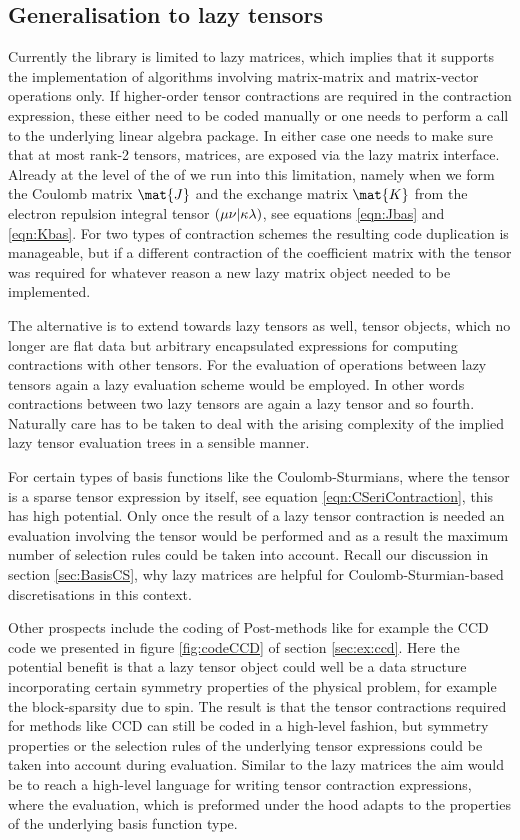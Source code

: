 \subsection{Generalisation to lazy tensors}
Currently the \lazyten library is limited to lazy matrices,
which implies that it supports the implementation of algorithms
involving matrix-matrix and matrix-vector operations only.
If higher-order tensor contractions are required in the contraction expression,
these either need to be coded manually or one needs to perform
a call to the underlying linear algebra package.
In either case one needs to make sure that at most rank-2 tensors,
\ie matrices, are exposed via the lazy matrix interface.
Already at the level of the \SCF of \molsturm we run into this limitation,
namely when we form the Coulomb matrix $\mat{J}$
and the exchange matrix $\mat{K}$ from the electron repulsion integral tensor
$\left( \mu\nu \middle| \kappa\lambda \right)$, see equations \eqref{eqn:Jbas} and \eqref{eqn:Kbas}.
For two types of contraction schemes the resulting code duplication is manageable,
but if a different contraction of the coefficient matrix
with the \ERI tensor was required for whatever reason
a new lazy matrix object needed to be implemented.

The alternative is to extend \lazyten towards lazy tensors as well,
\ie tensor objects, which no longer are flat data but arbitrary encapsulated
expressions for computing contractions with other tensors.
For the evaluation of operations between lazy tensors
again a lazy evaluation scheme would be employed.
In other words contractions between two lazy tensors are again
a lazy tensor and so fourth.
Naturally care has to be taken to deal with the arising complexity
of the implied lazy tensor evaluation trees in a sensible manner.

For certain types of basis functions like the Coulomb-Sturmians,
where the \ERI tensor is a sparse tensor expression by itself,
see equation \eqref{eqn:CSeriContraction},
this has high potential.
Only once the result of a lazy tensor contraction is needed
an evaluation involving the \CS \ERI tensor would be performed
and as a result the maximum number of selection rules could be taken into account.
Recall our discussion in section \vref{sec:BasisCS},
why lazy matrices are helpful for Coulomb-Sturmian-based discretisations
in this context.

Other prospects include the coding of Post-\HF methods
like for example the CCD code we presented in figure \ref{fig:codeCCD}
of section \ref{sec:ex:ccd}.
Here the potential benefit is that a lazy tensor object
could well be a data structure incorporating certain symmetry properties
of the physical problem,
for example the block-sparsity due to spin.
The result is that the tensor contractions required for methods like CCD
can still be coded in a high-level fashion,
but symmetry properties or the selection rules of the underlying
tensor expressions could be taken into account during evaluation.
Similar to the lazy matrices the aim would be to reach a high-level language
for writing tensor contraction expressions,
where the evaluation, which is preformed under the hood
adapts to the properties of the underlying basis function type.

